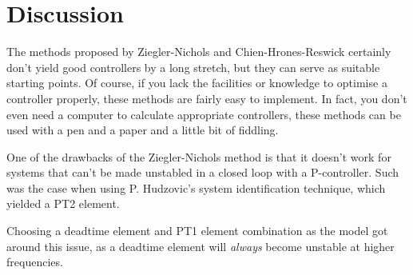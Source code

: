 \section{Discussion}

The  methods  proposed  by  Ziegler-Nichols and Chien-Hrones-Reswick certainly
don't yield good controllers by a long stretch, but they can serve as suitable
starting  points.  Of course, if you  lack  the  facilities  or  knowledge  to
optimise a controller properly, these methods are fairly easy to implement. In
fact, you don't  even  need  a  computer to calculate appropriate controllers,
these methods can be used with a pen and a paper and a little bit of fiddling.

One of the drawbacks of the Ziegler-Nichols method is that it doesn't work for
systems that can't be made unstabled  in  a  closed  loop with a P-controller.
Such  was the case when using P. Hudzovic's system  identification  technique,
which yielded a PT2 element.

Choosing a deadtime element  and  PT1  element  combination  as  the model got
around this issue,  as a deadtime element will \textit{always} become unstable
at higher frequencies.

